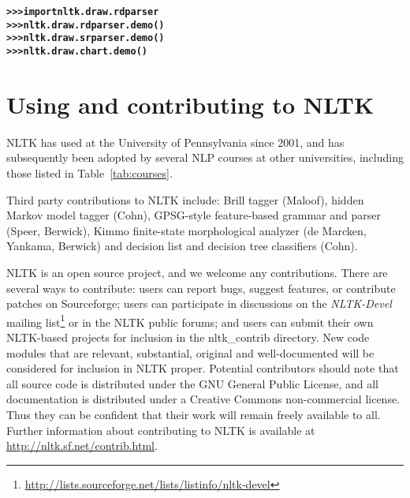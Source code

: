 \documentclass[11pt]{article}
\begin{document}
\begin{alltt} \small
\textbf{>>> import nltk.draw.rdparser}
\textbf{>>> nltk.draw.rdparser.demo()}
\textbf{>>> nltk.draw.srparser.demo()}
\textbf{>>> nltk.draw.chart.demo()}
\end{alltt}

\section{Using and contributing to NLTK}

NLTK has used at the University of Pennsylvania since 2001, and has
subsequently been adopted by several NLP courses at other
universities, including those listed in Table~\ref{tab:courses}.

Third party contributions to NLTK include: Brill tagger (Maloof),
hidden Markov model tagger (Cohn), GPSG-style feature-based grammar
and parser (Speer, Berwick), Kimmo finite-state morphological analyzer
(de Marcken, Yankama, Berwick) and decision list and decision tree
classifiers (Cohn).

NLTK is an open source project, and we welcome any contributions.
There are several ways to contribute: users can report bugs, suggest
features, or contribute patches on Sourceforge; users can participate
in discussions on the \textit{NLTK-Devel} mailing
list\footnote{\url{http://lists.sourceforge.net/lists/listinfo/nltk-devel}}
or in the NLTK public
forums; and users can submit their own NLTK-based projects for
inclusion in the nltk\_contrib directory.  New code modules that are
relevant, substantial, original and well-documented will be considered
for inclusion in NLTK proper.  Potential contributors should note that
all source code is distributed under the GNU General Public License,
and all documentation is distributed under a Creative Commons
non-commercial license.  Thus they can be confident that their
work will remain freely available to all.  Further information about
contributing to NLTK is available at \url{http://nltk.sf.net/contrib.html}.
\end{document}
